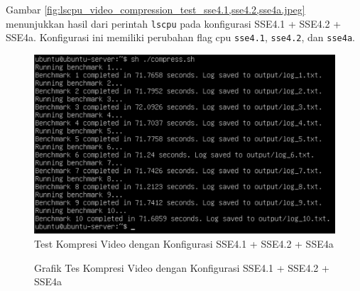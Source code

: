 Gambar \ref{fig:lscpu_video_compression_test_sse4.1,sse4.2,sse4a.jpeg} menunjukkan hasil dari perintah \texttt{lscpu} pada konfigurasi SSE4.1 + SSE4.2 + SSE4a. Konfigurasi ini memiliki perubahan flag cpu \texttt{sse4.1}, \texttt{sse4.2}, dan \texttt{sse4a}.

\begin{figure}
    \centering
    \includegraphics[width=1\textwidth]
    {assets/pics/video-compression-test/sse4.1,sse4.2,sse4a.jpeg}
    \caption{Test Kompresi Video dengan Konfigurasi SSE4.1 + SSE4.2 + SSE4a}
    \label{fig:video_compression_test_sse4.1,sse4.2,sse4a.jpeg}
\end{figure}

\begin{figure}
    \centering
    \caption{Grafik Tes Kompresi Video dengan Konfigurasi SSE4.1 + SSE4.2 + SSE4a}
    \label{fig:video_compression_test_sse4.1,sse4.2,sse4a_graph}
\end{figure}

